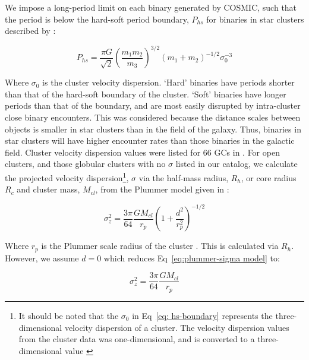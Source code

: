 \documentclass[twocolumn]{aastex63}
\begin{document}
We impose a long-period limit on each binary generated by COSMIC, such that the period is below the hard-soft period boundary, \textit{$P_{hs}$} for binaries in star clusters described by \citet{2015ApJ...808L..25G}:

\begin{equation} \label{eq: hs-boundary}
    P_{hs} = \frac{\pi G}{\sqrt{2}} \left( \frac{m_1m_2}{m_3} \right) ^{3/2}(m_1 + m_2)^{-1/2}\sigma_0^{-3}
\end{equation}

Where $\sigma_0$ is the cluster velocity dispersion. ‘Hard’ binaries have periods shorter than that of the hard-soft boundary of the cluster. ‘Soft’ binaries have longer periods than that of the boundary, and are most easily disrupted by intra-cluster close binary encounters. This was considered because the distance scales between objects is smaller in star clusters than in the field of the galaxy. Thus, binaries in star clusters will have higher encounter rates than those binaries in the galactic field. Cluster velocity dispersion values were listed for 66 GCs in \citet{1996AJ....112.1487H}. For open clusters, and those globular clusters with no $\sigma$ listed in our catalog, we calculate the projected velocity dispersion\footnote{It should be noted that the $\sigma_0$ in Eq~\ref{eq: hs-boundary} represents the three-dimensional velocity dispersion of a cluster. The velocity dispersion values from the cluster data was one-dimensional, and is converted to a three-dimensional value \citep{2015ApJ...808L..25G}}, $\sigma$  via the half-mass radius, $R_h$, or core radius $R_c$ and cluster mass, $M_{cl}$, from the Plummer model given in \cite{1911MNRAS..71..460P}:

\begin{equation}
    \sigma_z^2 = \frac{3\pi}{64}\frac{GM_{cl}}{r_p}\left(1 + \frac{d^2}{r_p^2} \right)^{-1/2}
    \label{eq:plummer-sigma model}
\end{equation}

 Where $r_p$ is the Plummer scale radius of the cluster \citep{1911MNRAS..71..460P}. This is calculated via $R_h$. However, we assume $d=0$ which reduces Eq~\ref{eq:plummer-sigma model} to:
 
 \begin{equation}
    \sigma_z^2 = \frac{3\pi}{64}\frac{GM_{cl}}{r_p}
    \label{eq:plummer-sigma mode (simplified)l}
\end{equation}
 
\end{document}
